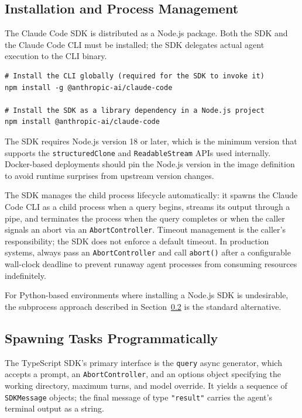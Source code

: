 \subsection{Installation and Process Management}
\label{app:sdk-commercial:cc-sdk:install}

The Claude Code SDK is distributed as a Node.js package. Both the SDK and the Claude
Code CLI must be installed; the SDK delegates actual agent execution to the CLI binary.

\begin{verbatim}
# Install the CLI globally (required for the SDK to invoke it)
npm install -g @anthropic-ai/claude-code

# Install the SDK as a library dependency in a Node.js project
npm install @anthropic-ai/claude-code
\end{verbatim}

The SDK requires Node.js version 18 or later, which is the minimum version that
supports the \texttt{structuredClone} and \texttt{ReadableStream} APIs used internally.
Docker-based deployments should pin the Node.js version in the image definition to
avoid runtime surprises from upstream version changes.

The SDK manages the child process lifecycle automatically: it spawns the Claude Code
CLI as a child process when a query begins, streams its output through a pipe, and
terminates the process when the query completes or when the caller signals an abort via
an \texttt{AbortController}. Timeout management is the caller's responsibility; the
SDK does not enforce a default timeout. In production systems, always pass an
\texttt{AbortController} and call \texttt{abort()} after a configurable wall-clock
deadline to prevent runaway agent processes from consuming resources indefinitely.

For Python-based environments where installing a Node.js SDK is undesirable, the
subprocess approach described in Section~\ref{app:sdk-commercial:cc-sdk:spawn} is
the standard alternative.

\subsection{Spawning Tasks Programmatically}
\label{app:sdk-commercial:cc-sdk:spawn}

The TypeScript SDK's primary interface is the \texttt{query} async generator, which
accepts a prompt, an \texttt{AbortController}, and an options object specifying the
working directory, maximum turns, and model override. It yields a sequence of
\texttt{SDKMessage} objects; the final message of type \texttt{"result"} carries the
agent's terminal output as a string.

